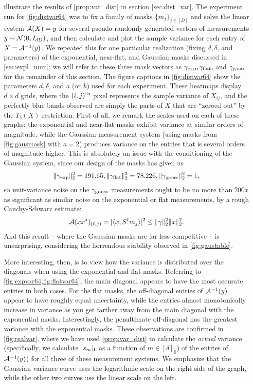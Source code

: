  illustrate the results of \cref{prop:var_dist} in section \cref{sec:dist_var}.  The experiment run for \cref{fig:distvar64} was to fix a family of masks $\{m_j\}_{j \in [D]}$ and solve the linear system $\mathcal{A}(X) = y$ for several pseudo-randomly generated vectors of measurements $y \sim \mathcal{N}(0, I_{dD})$, and then calculate and plot the sample variance for each entry of $X = \mathcal{A}^{-1}(y)$.  We repeated this for one particular realization (fixing $d, \delta$, and parameters) of the exponential, near-flat, and Gaussian masks discussed in \cref{sec:expl_num}; we will refer to these three mask vectors as $\gamma_{\rm exp}, \gamma_{\rm flat},$ and $\gamma_{\rm gauss}$ for the remainder of this section.  The figure captions in \cref{fig:distvar64} show the parameters $d, \delta$, and $a$ (or $k$) used for each experiment.  These heatmaps display $d \times d$ grids, where the $(i, j)^{\text{th}}$ pixel represents the sample variance of $X_{ij}$, and the perfectly blue bands observed are simply the parts of $X$ that are ``zeroed out'' by the $T_\delta(X)$ restriction.  First of all, we remark the scales used on each of these graphs: the exponential and near-flat masks exhibit variance at similar orders of magnitude, while the Gaussian measurement system (using masks from \cref{fig:gausmask} with $a = 2$) produces variance on the entries that is several orders of magnitude higher.  This is absolutely an issue with the conditioning of the Gaussian system, since our design of the masks has given us \[\lVert\gamma_{\mathrm{exp}}\rVert_2^2 = 191.65, \lVert\gamma_{\rm flat}\rVert_2^2 = 78.226, \lVert\gamma_{\rm gauss}\rVert_2^2 = 1,\] so unit-variance noise on the $\gamma_{\rm gauss}$ measurements ought to be no more than $200x$ as significant as similar noise on the exponential or flat measurements, by a rough Cauchy-Schwarz estimate: \[\mathcal{A}(x x^*)_{(\ell, j)} = \lvert\langle x, S^\ell m_j\rangle\rvert^2 \le \lVert\gamma\rVert_2^2 \lVert x\rVert_2^2.\]  And this result -- where the Gaussian masks are far less competitive -- is unsurprising, considering the horrendous stability observed in \cref{fig:gaustable}.

More interesting, then, is to view how the variance is distributed over the diagonals when using the exponential and flat masks.  Referring to \cref{fig:expvar64,fig:flatvar64}, the main diagonal appears to have the most accurate entries in both cases.  For the flat masks, the off-diagonal entries of $\mathcal{A}^{-1}(y)$ appear to have roughly equal uncertainty, while the entries almost monotonically increase in variance as you get farther away from the main diagonal with the exponential masks.  Interestingly, the penultimate off-diagonal has the greatest variance with the exponential masks.  These observations are confirmed in \cref{fig:realvar}, where we have used \cref{prop:var_dist} to calculate the \emph{actual} variance (specifically, we calculate $\lvert s_m\rvert_1$ as a function of $m \in [\delta]_0$) of the entries of $\mathcal{A}^{-1}(y)$) for all three of these measurement systems.  We emphasize that the Gaussian variance curve uses the logarithmic scale on the right side of the graph, while the other two curves use the linear scale on the left.

